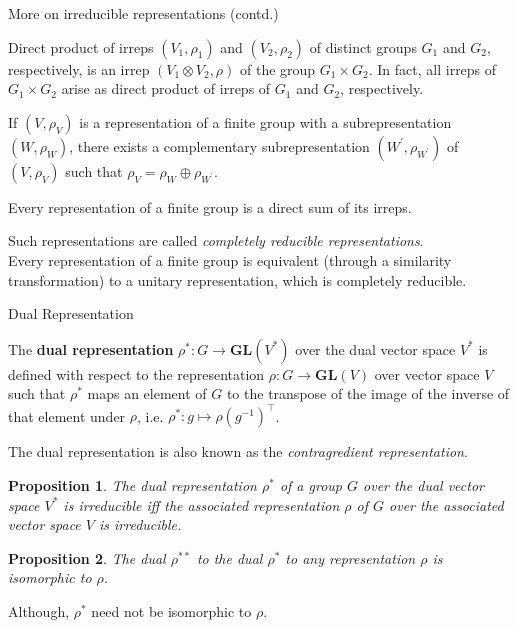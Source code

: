 \documentclass{beamer}
\newtheorem{proposition}{Proposition}
\newcommand\boldtext[1]{\textcolor{bolds}{\textbf{#1}}}
\newcommand\italictext[1]{\textcolor{italics}{\textit{#1}}}
\begin{document}
\begin{frame}{More on irreducible representations (contd.)}
    \begin{theorem}
        Direct product of irreps $(V_1,\rho_1)$ and $(V_2,\rho_2)$ of distinct groups $G_1$ and $G_2$, respectively, is an irrep $(V_1\otimes V_2,\rho)$ of the group $G_1\times G_2$. In fact, all irreps of $G_1\times G_2$ arise as direct product of irreps of $G_1$ and $G_2$, respectively.
    \end{theorem}
    \begin{theorem}
        If $(V,\rho_V)$ is a representation of a finite group with a subrepresentation $(W,\rho_W)$, there exists a complementary subrepresentation $(W^\prime,\rho_{W^\prime})$ of $(V,\rho_V)$ such that $\rho_V=\rho_W\oplus\rho_{W^\prime}$.
    \end{theorem}
    \begin{corollary}
        Every representation of a finite group is a direct sum of its irreps.
    \end{corollary}
    Such representations are called \italictext{completely reducible representations}.\\
    Every representation of a finite group is equivalent (through a similarity transformation) to a unitary representation, which is completely reducible.
\end{frame}

\begin{frame}{Dual Representation}
    \begin{definition}
        The \boldtext{dual representation} $\rho^*:G\xrightarrow{} \mathbf{GL}(V^*)$ over the dual vector space $V^*$ is defined with respect to the representation $\rho:G\xrightarrow{} \mathbf{GL}(V)$ over vector space $V$ such that $\rho^*$ maps an element of $G$ to the transpose of the image of the inverse of that element under $\rho$, i.e. $\rho^*:g\mapsto{\rho(g^{-1})}^\intercal$.
    \end{definition}
    The dual representation is also known as the \italictext{contragredient representation}.
    \begin{proposition}
        The dual representation $\rho^*$ of a group $G$ over the dual vector space $V^*$ is irreducible iff the associated representation $\rho$ of $G$ over the associated vector space $V$ is irreducible.
    \end{proposition}
    \begin{proposition}
        The dual ${\rho}^{**}$ to the dual $\rho^*$ to any representation $\rho$ is isomorphic to $\rho$.
    \end{proposition}
    Although, $\rho^*$ need not be isomorphic to $\rho$.
\end{frame}
\end{document}
